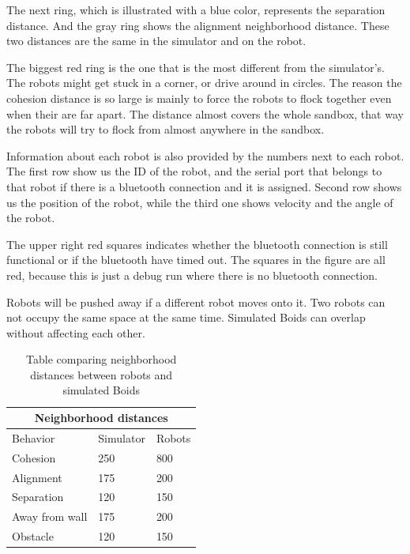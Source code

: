 The next ring, which is illustrated with a blue color, represents the separation distance. And the gray ring shows the alignment neighborhood distance. These two distances are the same in the simulator and on the robot.

The biggest red ring is the one that is the most different from the simulator's. The robots might get stuck in a corner, or drive around in circles.
The reason the cohesion distance is so large is mainly to force the robots to flock together even when their are far apart. The distance almost covers the whole sandbox, that way the robots will try to flock from almost anywhere in the sandbox.

Information about each robot is also provided by the numbers next to each robot.
The first row show us the ID of the robot, and the serial port that belongs to that robot if there is a bluetooth connection and it is assigned.
Second row shows us the position of the robot, while the third one shows velocity and the angle of the robot.

The upper right red squares indicates whether the bluetooth connection is still functional or if the bluetooth have timed out. The squares in the figure are all red, because this is just a debug run where there is no bluetooth connection.

Robots will be pushed away if a different robot moves onto it. Two robots can not occupy the same space at the same time. Simulated Boids can overlap without affecting each other.


\begin{table}[h]
\begin{center}
\begin{tabular}{|l|l|l|}
\hline
\multicolumn{3}{|c|}{Neighborhood distances} \\ \hline
Behavior          & Simulator    & Robots    \\ \hline
Cohesion          & 250          & 800       \\ \hline
Alignment         & 175          & 200       \\ \hline
Separation        & 120          & 150       \\ \hline
Away from wall    & 175          & 200       \\ \hline
Obstacle          & 120          & 150       \\ \hline
\end{tabular}
\caption[Neighborhood distance comparison]{Table comparing neighborhood distances between robots and simulated Boids}
\end{center}
\label{tab:dists}
\end{table}

